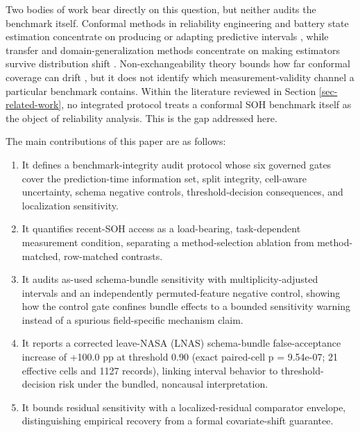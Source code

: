 \documentclass[
  number,
  preprint]{elsarticle}
\providecommand{\tightlist}{%
  \setlength{\itemsep}{0pt}\setlength{\parskip}{0pt}}
\begin{document}
Two bodies of work bear directly on this question, but neither audits
the benchmark itself. Conformal methods in reliability engineering and
battery state estimation concentrate on producing or adapting predictive
intervals
\citep{xu2026uncertaintyaware, wang2025robust, javanmardi2023conformal, piao2025crulp, soon2026enhancing},
while transfer and domain-generalization methods concentrate on making
estimators survive distribution shift
\citep{nejjar2024domain, nejjar2026uncertaintyguided, fei2026decoupled}.
Non-exchangeability theory bounds how far conformal coverage can drift
\citep{barber2023beyond, oliveira2024split}, but it does not identify
which measurement-validity channel a particular benchmark contains.
Within the literature reviewed in Section \ref{sec-related-work}, no
integrated protocol treats a conformal SOH benchmark itself as the
object of reliability analysis. This is the gap addressed here.

The main contributions of this paper are as follows:

\begin{enumerate}
\def\labelenumi{\arabic{enumi}.}
\tightlist
\item
  It defines a benchmark-integrity audit protocol whose six governed
  gates cover the prediction-time information set, split integrity,
  cell-aware uncertainty, schema negative controls, threshold-decision
  consequences, and localization sensitivity.
\item
  It quantifies recent-SOH access as a load-bearing, task-dependent
  measurement condition, separating a method-selection ablation from
  method-matched, row-matched contrasts.
\item
  It audits as-used schema-bundle sensitivity with multiplicity-adjusted
  intervals and an independently permuted-feature negative control,
  showing how the control gate confines bundle effects to a bounded
  sensitivity warning instead of a spurious field-specific mechanism
  claim.
\item
  It reports a corrected leave-NASA (LNAS) schema-bundle
  false-acceptance increase of +100.0 pp at threshold 0.90 (exact
  paired-cell p = 9.54e-07; 21 effective cells and 1127 records),
  linking interval behavior to threshold-decision risk under the
  bundled, noncausal interpretation.
\item
  It bounds residual sensitivity with a localized-residual comparator
  envelope, distinguishing empirical recovery from a formal
  covariate-shift guarantee.
\end{enumerate}
\end{document}
